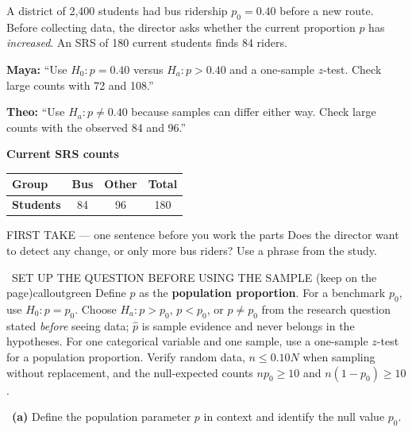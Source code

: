 \documentclass[11pt]{article}
\begin{document}
A district of 2{,}400 students had bus ridership $p_0=0.40$ before a new route. Before collecting data, the director asks whether the current proportion $p$ has \emph{increased}. An SRS of 180 current students finds 84 riders.\par\smallskip \textbf{Maya:} ``Use $H_0:p=0.40$ versus $H_a:p>0.40$ and a one-sample $z$-test. Check large counts with 72 and 108.''\par \textbf{Theo:} ``Use $H_a:p\neq0.40$ because samples can differ either way. Check large counts with the observed 84 and 96.''\par
\begin{center}
\textbf{Current SRS counts}\par\smallskip
\begin{tabular}{|l|c|c|c|}
\hline
\textbf{Group} & \textbf{Bus} & \textbf{Other} & \textbf{Total} \\ \hline
\textbf{Students} & 84 & 96 & 180 \\ \hline
\end{tabular}
\end{center}
\begin{firsttakebox}{FIRST TAKE --- one sentence before you work the parts}
Does the director want to detect any change, or only more bus riders? Use a phrase from the study.\par
{}
\end{firsttakebox}

\begin{callout}{\IconBook\ SET UP THE QUESTION BEFORE USING THE SAMPLE (keep on the page)}{calloutgreen}
Define $p$ as the \textbf{population proportion}. For a benchmark $p_0$, use $H_0:p=p_0$.
Choose $H_a:p>p_0$, $p<p_0$, or $p\neq p_0$ from the research question stated \emph{before} seeing data;
$\hat p$ is sample evidence and never belongs in the hypotheses. For one categorical variable and one sample,
use a one-sample $z$-test for a population proportion. Verify random data, $n\leq0.10N$ when sampling without
replacement, and the null-expected counts $np_0\geq10$ and $n(1-p_0)\geq10$.
\end{callout}

~\textbf{(a)} Define the population parameter $p$ in context and identify the null value $p_0$.\par
{}
\end{document}
